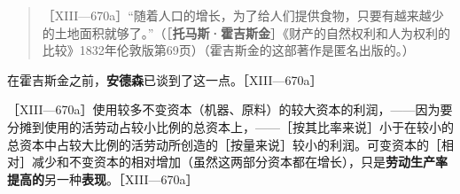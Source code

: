 \begin{quote}{［XIII—670a］“随着人口的增长，为了给人们提供食物，只要有越来越少的土地面积就够了。”（［\textbf{托马斯·霍吉斯金}］《财产的自然权利和人为权利的比较》1832年伦敦版第69页）（霍吉斯金的这部著作是匿名出版的。）}\end{quote}

在霍吉斯金之前，\textbf{安德森}已谈到了这一点。［XIII—670a］


［XIII—670a］使用较多不变资本（机器、原料）的较大资本的利润，——因为要分摊到使用的活劳动占较小比例的总资本上，——［按其比率来说］小于在较小的总资本中占较大比例的活劳动所创造的［按量来说］较小的利润。可变资本的［相对］减少和不变资本的相对增加（虽然这两部分资本都在增长），只是\textbf{劳动生产率提高的}另一种\textbf{表现}。［XIII—670a］

